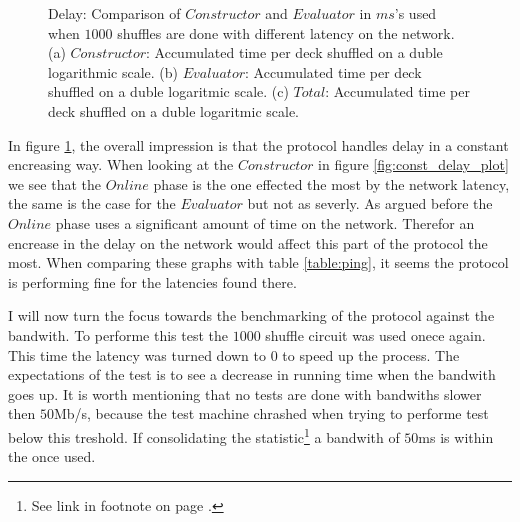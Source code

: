 \documentclass[twoside,11pt,openright]{report}
\begin{document}
\begin{figure}
    \vspace*{0cm}

    \begin{subfigure}{\textwidth}
        \centering
        \caption{}
        \label{fig:total_delay_plot}
    \end{subfigure}
    \caption{Delay: Comparison of $Constructor$ and $Evaluator$ in $ms$'s used when $1000$ shuffles are done with different latency on the network. (a) $Constructor$: Accumulated time per deck shuffled on a duble logarithmic scale. (b) $Evaluator$: Accumulated time per deck shuffled on a duble logaritmic scale. (c) $Total$: Accumulated time per deck shuffled on a duble logaritmic scale.}
    \label{fig:mesurement_delay}
\end{figure}

In figure \ref{fig:total_delay_plot}, the overall impression is that the protocol handles delay in a constant encreasing way. When looking at the $Constructor$ in figure \ref{fig:const_delay_plot} we see that the $Online$ phase is the one effected the most by the network latency, the same is the case for the $Evaluator$ but not as severly. As argued before the $Online$ phase uses a significant amount of time on the network. Therefor an encrease in the delay on the network would affect this part of the protocol the most. When comparing these graphs with table \ref{table:ping}, it seems the protocol is performing fine for the latencies found there.

\bigskip

I will now turn the focus towards the benchmarking of the protocol against the bandwith. To performe this test the $1000$ shuffle circuit was used onece again. This time the latency was turned down to $0$ to speed up the process. The expectations of the test is to see a decrease in running time when the bandwith goes up. It is worth mentioning that no tests are done with bandwiths slower then $50$Mb/s, because the test machine chrashed when trying to performe test below this treshold. If consolidating the statistic\footnote{See link in footnote on page \pageref{footnote:bandwith_stats}.} a bandwith of $50$ms is within the once used. 
\end{document}
